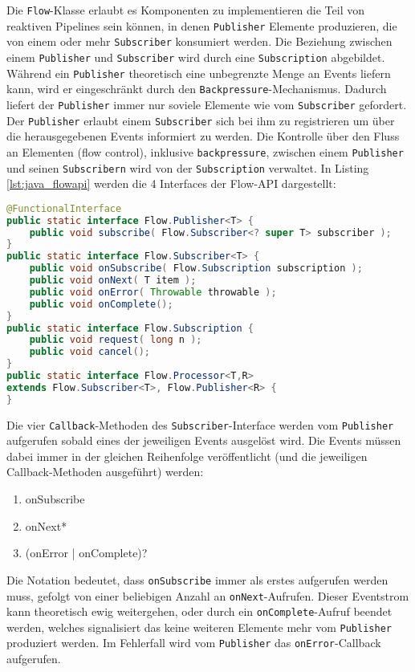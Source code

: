 Die \verb|Flow|-Klasse erlaubt es Komponenten zu implementieren die Teil von reaktiven Pipelines sein können, in denen
\verb|Publisher| Elemente produzieren, die von einem oder mehr \verb|Subscriber| konsumiert werden. Die Beziehung zwischen einem
\verb|Publisher| und \verb|Subscriber| wird durch eine \verb|Subscription| abgebildet.
Während ein \verb|Publisher| theoretisch eine unbegrenzte Menge an Events liefern kann, wird er eingeschränkt durch den
\verb|Backpressure|-Mechanismus. Dadurch liefert der \verb|Publisher| immer nur soviele Elemente wie vom \verb|Subscriber| gefordert.
Der \verb|Publisher| erlaubt einem \verb|Subscriber| sich bei ihm zu registrieren um über die herausgegebenen Events informiert zu werden.
Die Kontrolle über den Fluss an Elementen (flow control), inklusive \verb|backpressure|, zwischen einem \verb|Publisher| und seinen \verb|Subscribern|
wird von der \verb|Subscription| verwaltet.
In Listing \ref{lst:java_flowapi} werden die 4 Interfaces der Flow-API dargestellt:
\begin{lstlisting}[language=java, caption=Die Klasse java.util.concurrent.Flow, captionpos=b, label=lst:java_flowapi]
@FunctionalInterface
public static interface Flow.Publisher<T> {
	public void subscribe( Flow.Subscriber<? super T> subscriber );
}
public static interface Flow.Subscriber<T> {
	public void onSubscribe( Flow.Subscription subscription );
	public void onNext( T item );
	public void onError( Throwable throwable );
	public void onComplete();
}
public static interface Flow.Subscription {
	public void request( long n );
	public void cancel();
}
public static interface Flow.Processor<T,R>
extends Flow.Subscriber<T>, Flow.Publisher<R> {
}
\end{lstlisting}\parencite[Kapitel 5.11]{JavaSE9StandardBibliothek}

Die vier \verb|Callback|-Methoden des \verb|Subscriber|-Interface werden vom \verb|Publisher| aufgerufen sobald eines der jeweiligen Events ausgelöst wird.
Die Events müssen dabei immer in der gleichen Reihenfolge veröffentlicht (und die jeweiligen Callback-Methoden ausgeführt) werden:
\begin{enumerate}
	\item onSubscribe
	\item onNext*
	\item (onError | onComplete)?
\end{enumerate}
Die Notation bedeutet, dass \verb|onSubscribe| immer als erstes aufgerufen werden muss, gefolgt von einer beliebigen Anzahl an
\verb|onNext|-Aufrufen. Dieser Eventstrom kann theoretisch ewig weitergehen, oder durch ein \verb|onComplete|-Aufruf beendet werden, welches
signalisiert das keine weiteren Elemente mehr vom \verb|Publisher| produziert werden.
Im Fehlerfall wird vom \verb|Publisher| das \verb|onError|-Callback aufgerufen.

